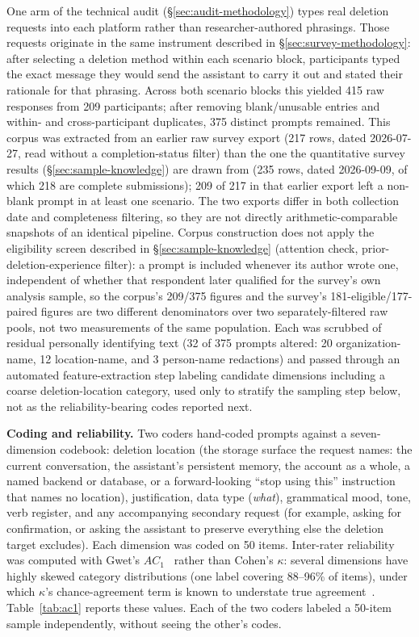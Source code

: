 \documentclass[conference,compsoc]{IEEEtran}
\begin{document}
One arm of the technical audit (\S\ref{sec:audit-methodology}) types real
deletion requests into each platform rather than researcher-authored
phrasings. Those requests originate in the same instrument described in
\S\ref{sec:survey-methodology}: after selecting a deletion method within
each scenario block, participants typed the exact message they would send
the assistant to carry it out and stated their rationale for that
phrasing. Across both scenario blocks this yielded 415 raw responses from
209 participants; after removing blank/unusable entries and within- and
cross-participant duplicates, 375 distinct prompts remained. This corpus
was extracted from an earlier raw survey export (217 rows, dated
2026-07-27, read without a completion-status filter) than the one the
quantitative survey results (\S\ref{sec:sample-knowledge}) are drawn from
(235 rows, dated 2026-09-09, of which 218 are complete submissions);
209 of 217 in that earlier export left a non-blank prompt in at least one
scenario. The two exports differ in both collection date and completeness
filtering, so they are not directly arithmetic-comparable snapshots of an
identical pipeline. Corpus construction does not apply the eligibility
screen described in \S\ref{sec:sample-knowledge} (attention check,
prior-deletion-experience filter): a prompt is included whenever its
author wrote one, independent of whether that respondent later qualified
for the survey's own analysis sample, so the corpus's 209/375 figures and
the survey's 181-eligible/177-paired figures are two different
denominators over two separately-filtered raw pools, not two measurements
of the same population. Each was
scrubbed of residual personally identifying text (32 of 375 prompts
altered: 20 organization-name, 12 location-name, and 3 person-name
redactions) and passed through an
automated feature-extraction step labeling candidate dimensions including
a coarse deletion-location category, used only to stratify the sampling
step below, not as the reliability-bearing codes reported next.

\textbf{Coding and reliability.} Two coders hand-coded prompts against a
seven-dimension codebook: deletion location (the storage surface the
request names: the current conversation, the assistant's persistent
memory, the account as a whole, a named backend or database, or a
forward-looking ``stop using this'' instruction that names no location),
justification, data type (\emph{what}), grammatical mood, tone, verb
register, and any accompanying secondary request (for example, asking for
confirmation, or asking the assistant to preserve everything else the
deletion target excludes). Each dimension was coded on 50 items.
Inter-rater reliability was computed with Gwet's $AC_1$~\cite{gwet2008ac1}
rather than Cohen's $\kappa$: several dimensions have highly skewed
category distributions (one label covering 88--96\% of items), under which
$\kappa$'s chance-agreement term is known to understate true
agreement~\cite{gwet2008ac1,wongpakaran2013comparison}.
Table~\ref{tab:ac1} reports these values. Each of the two coders labeled a
50-item sample independently, without seeing the other's codes.
\end{document}

